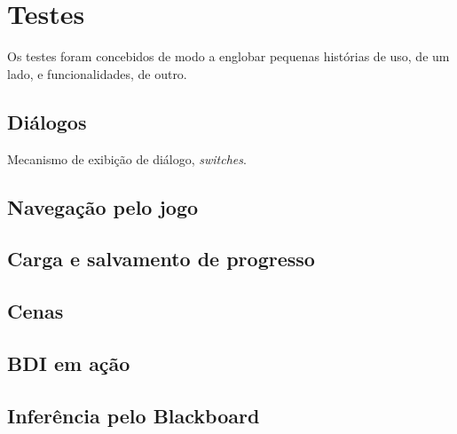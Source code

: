 \chapter{Testes}


Os testes foram concebidos de modo a englobar pequenas histórias de
uso, de um lado, e funcionalidades, de outro.

\section{Diálogos}

Mecanismo de exibição de diálogo, \emph{switches}.

\section{Navegação pelo jogo}

\section{Carga e salvamento de progresso}

\section{Cenas}

\section{BDI em ação}

\section{Inferência pelo Blackboard}

